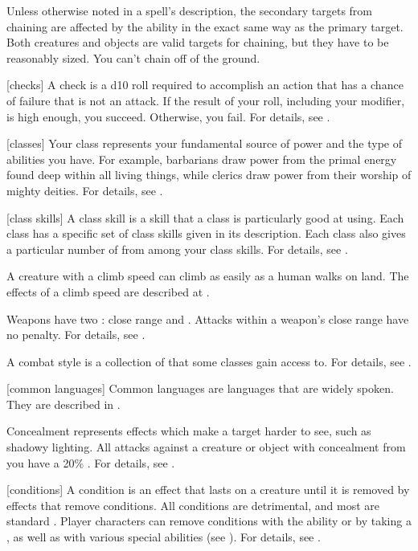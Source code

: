 Unless otherwise noted in a spell's description, the secondary targets from chaining are affected by the ability in the exact same way as the primary target.
Both creatures and objects are valid targets for chaining, but they have to be reasonably sized.
You can't chain off of the ground.

[checks] A check is a d10 roll required to accomplish an action that has a chance of failure that is not an attack.
If the result of your roll, including your modifier, is high enough, you succeed.
Otherwise, you fail.
For details, see .

[classes] Your class represents your fundamental source of power and the type of abilities you have.
For example, barbarians draw power from the primal energy found deep within all living things, while clerics draw power from their worship of mighty deities.
For details, see .

[class skills] A class skill is a skill that a class is particularly good at using.
Each class has a specific set of class skills given in its description.
Each class also gives a particular number of  from among your class skills.
For details, see .

 A creature with a climb speed can climb as easily as a human walks on land.
The effects of a climb speed are described at .

 Weapons have two : close range and .
Attacks within a weapon's close range have no penalty.
For details, see .

 A combat style is a collection of  that some classes gain access to.
For details, see .

[common languages] Common languages are languages that are widely spoken.
They are described in .

 Concealment represents effects which make a target harder to see, such as shadowy lighting.
All  attacks against a creature or object with concealment from you have a 20\% .
For details, see .

[conditions] A condition is an effect that lasts on a creature until it is removed by effects that remove conditions.
All conditions are detrimental, and most are standard .
Player characters can remove conditions with the  ability or by taking a , as well as with various special abilities (see ).
For details, see .

